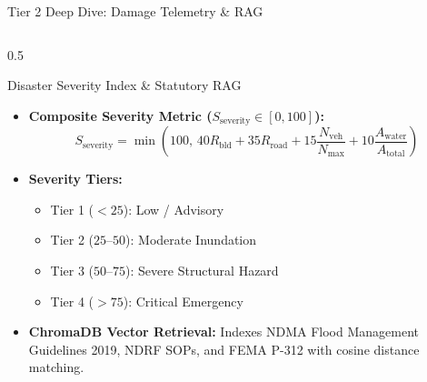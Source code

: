 \documentclass[aspectratio=169, 10pt, professionalfonts]{beamer}
\begin{document}
\begin{frame}{Tier 2 Deep Dive: Damage Telemetry \& RAG}
\begin{columns}[T]
    \begin{column}{0.5\textwidth}
      \begin{block}{Disaster Severity Index \& Statutory RAG}
        \begin{itemize}\setlength{\itemsep}{0.4em}\footnotesize
          \item \textbf{Composite Severity Metric ($S_{\text{severity}} \in [0, 100]$):}
            $$S_{\text{severity}} = \min\left(100, \, 40 R_{\text{bld}} + 35 R_{\text{road}} + 15 \frac{N_{\text{veh}}}{N_{\text{max}}} + 10 \frac{A_{\text{water}}}{A_{\text{total}}}\right)$$
          \item \textbf{Severity Tiers:}
            \begin{itemize}\scriptsize
              \item Tier 1 ($<25$): Low / Advisory
              \item Tier 2 ($25$--$50$): Moderate Inundation
              \item Tier 3 ($50$--$75$): Severe Structural Hazard
              \item Tier 4 ($>75$): Critical Emergency
            \end{itemize}
          \item \textbf{ChromaDB Vector Retrieval:} Indexes NDMA Flood Management Guidelines 2019, NDRF SOPs, and FEMA P-312 with cosine distance matching.
        \end{itemize}
      \end{block}
    \end{column}
  \end{columns}
\end{frame}
\end{document}
